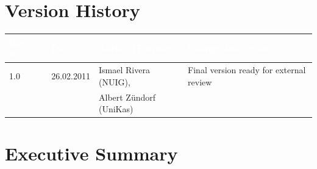 \documentclass{article}
\begin{document}


\section*{Version History}

\begin{small}
\begin{tabular}{|l|l|l|p{7.5cm}|}
\hline
\rowcolor{fast@lightgrey}\textcolor{white}{\textbf{Rev. No.}} &
                            \textcolor{white}{\textbf{Date}} &
                            \textcolor{white}{\textbf{Author (Partner)}} &
							\textcolor{white}{\textbf{Change description}}\\ \hline
1.0 & 26.02.2011 & Ismael Rivera (NUIG), & Final version ready for external review \\ 
 & & Albert Zündorf (UniKas) & \\ \hline
\end{tabular}
\end{small}

\color{black}

\vfill

\newpage


\clearpage

\section*{Executive Summary}
\doublespacing
\end{document}
